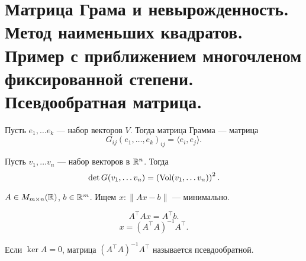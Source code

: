 \section{Матрица Грама и невырожденность. Метод наименьших квадратов. Пример с приближением многочленом фиксированной степени. Псевдообратная матрица.}
\begin{defn}
    Пусть $ e_1, \ldots e_k$ --- набор векторов $ V$. Тогда {\sf матрица Грамма} --- матрица
    \[
	G_{ij}(e_1, \ldots , e_k)_{ij} = \langle e_i, e_j \rangle
    .\] 
\end{defn}
\begin{lm}
    Пусть $ v_1, \ldots v_n $ --- набор векторов в $ \mathbb{R}^{n} $. Тогда 
    \[
	\det G(v_1, \ldots v_n) = \left( \operatorname{Vol}(v_1, \ldots v_n) \right) ^2
    .\] 
\end{lm}
\begin{thm}
    $ A \in M_{m \times n} (\mathbb{R})$, $ b \in \mathbb{R}^{m} $. Ищем $ x\colon \| Ax - b \| $ --- минимально.

    \[
    A^{\top } A x = A^{\top} b
    .\] 
    \[
	x = (A^{\top} A)^{-1} A^{\top}
    .\] 
\end{thm}
\begin{defn}
    Если $ \ker A = 0$, матрица $ (A^{\top}A)^{-1} A^{\top}$ называется {\sf псевдообратной}.   
\end{defn}
